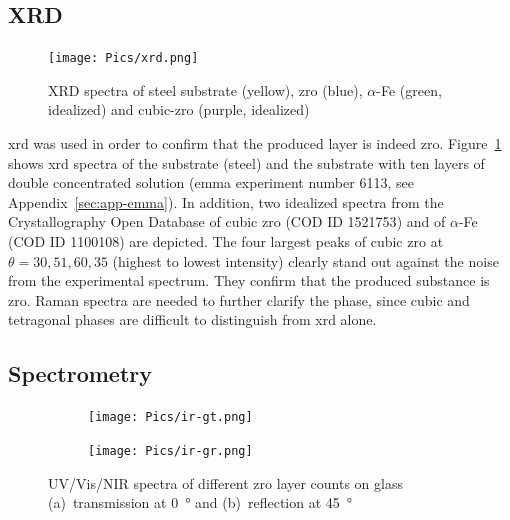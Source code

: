 \subsection{XRD}
\begin{figure}
	\centering
	\texttt{[image: Pics/xrd.png]}
	\caption{XRD spectra of steel substrate (yellow), \gls{zro} (blue), $\alpha$-Fe (green, idealized) and cubic-\gls{zro} (purple, idealized)\cite{gkatz1971xray}}
	\label{fig:xrd}
\end{figure}

\Gls{xrd} was used in order to confirm that the produced layer is indeed \gls{zro}. 
Figure~\ref{fig:xrd} shows \gls{xrd} spectra of the substrate (steel) and 
the substrate with ten layers of double concentrated solution (\gls{emma} experiment number 6113, see Appendix~\ref{sec:app-emma}).
In addition, two idealized spectra from the Crystallography Open Database of cubic \gls{zro} (COD ID 1521753\cite{gkatz1971xray}) and of $\alpha$-Fe (COD ID 1100108) are depicted.
%
The four largest peaks of cubic \gls{zro} at $\theta=30, 51, 60, 35$ (highest to lowest intensity) clearly stand out against the noise from the experimental spectrum. %
They confirm that the produced substance is \gls{zro}.
Raman spectra are needed 
to further clarify the phase, 
since cubic and tetragonal phases are difficult to distinguish from \gls{xrd} alone\cite{Purohit2006Combustion}.

\subsection{Spectrometry}

\begin{figure}[htb]
    \centering
    \begin{subfigure}{.49\textwidth}
        \centering
        \texttt{[image: Pics/ir-gt.png]}
		\caption{}%
		\label{fig:ir-gt}
    \end{subfigure}
    \begin{subfigure}{.49\textwidth}
        \centering
        \texttt{[image: Pics/ir-gr.png]}
		\caption{}%
		\label{fig:ir-gr}
    \end{subfigure}
	\label{fig:ir}
	\caption{UV/Vis/NIR spectra of different \gls{zro} layer counts on glass 
	(a)~transmission at \SI{0}{\degree} and (b)~reflection at \SI{45}{\degree} 
	} 
\end{figure}

